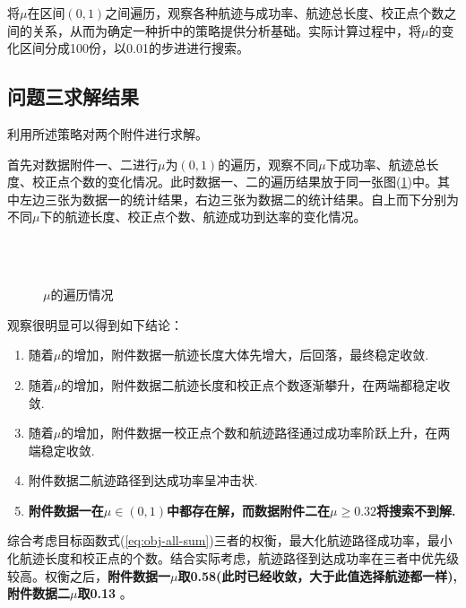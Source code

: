 将$\mu$在区间$(0,1)$之间遍历，观察各种航迹与成功率、航迹总长度、校正点个数之间的关系，从而为确定一种折中的策略提供分析基础。实际计算过程中，将$\mu$的变化区间分成100份，以0.01的步进进行搜索。

\subsection{问题三求解结果}
利用所述策略对两个附件进行求解。

首先对数据附件一、二进行$\mu$为$(0,1)$的遍历，观察不同$\mu$下成功率、航迹总长度、校正点个数的变化情况。此时数据一、二的遍历结果放于同一张图(\ref{fig:mu})中。其中左边三张为数据一的统计结果，右边三张为数据二的统计结果。自上而下分别为不同$\mu$下的航迹长度、校正点个数、航迹成功到达率的变化情况。
\begin{figure} 
	\centering
	 \quad
	 \\
     \quad
	 \\
     \quad
	\caption{$\mu$的遍历情况}
	\label{fig:mu}
\end{figure}

\newpage
\noindent 观察很明显可以得到如下结论：
\begin{enumerate}
	\item 随着$\mu$的增加，附件数据一航迹长度大体先增大，后回落，最终稳定收敛.
	\item 随着$\mu$的增加，附件数据二航迹长度和校正点个数逐渐攀升，在两端都稳定收敛.
	\item 随着$\mu$的增加，附件数据一校正点个数和航迹路径通过成功率阶跃上升，在两端稳定收敛.
	\item 附件数据二航迹路径到达成功率呈冲击状.
	\item \textbf{附件数据一在$\mu \in (0,1)$中都存在解，而数据附件二在$\mu  \geq 0.32 $将搜索不到解.}
\end{enumerate}

综合考虑目标函数式(\ref{eq:obj-all-sum})三者的权衡，最大化航迹路径成功率，最小化航迹长度和校正点的个数。结合实际考虑，航迹路径到达成功率在三者中优先级较高。权衡之后，\textbf{附件数据一$\mu$取0.58(此时已经收敛，大于此值选择航迹都一样),附件数据二$\mu$取0.13 }。

